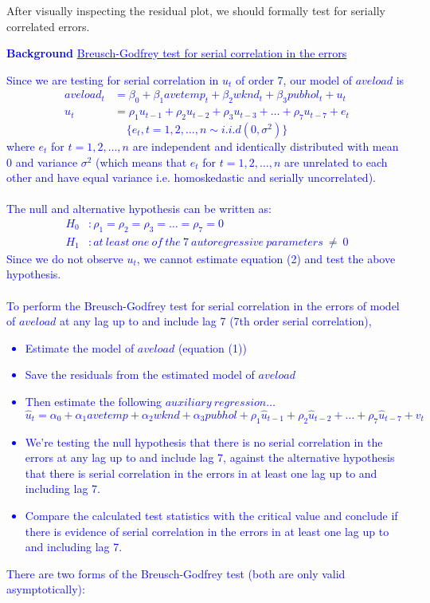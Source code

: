 \documentclass[12pt]{report}
\newenvironment{blueframed}[1][blue]
{\def\FrameCommand{\fboxsep=\FrameSep\fcolorbox{#1}{white}}%
\MakeFramed {\advance\hsize-\width \FrameRestore}}
{\endMakeFramed}
\begin{document}
\noindent After visually inspecting the residual plot, we should formally test for serially correlated errors.


\newpage
\justify
\begin{blueframed}
	\textcolor{blue}{\textbf{Background}}
	\vspace{-\baselineskip}
	\justify
	\textcolor{blue}{\underline{Breusch-Godfrey test for serial correlation in the errors}}
	
	\noindent \textcolor{blue}
	{
		Since we are testing for serial correlation in $u_t$ of order 7, our model of $aveload$ is
		\begin{align}
		aveload_t &= \beta_0 + \beta_1 avetemp_t + \beta_2wknd_t + \beta_3pubhol_t + u_t \\
		u_t &= \rho_1u_{t-1} + \rho_2u_{t-2} + \rho_3u_{t-3} + \dots + \rho_7u_{t-7} + e_t
		\end{align} $$\{e_t, t=1,2,\dots,n \sim i.i.d(0,\sigma^2)\}$$ where $e_t$ for $t=1,2,\dots,n$ are independent and identically distributed with mean 0 and variance $\sigma^2$ (which means that $e_t$ for $t=1,2,\dots,n$ are unrelated to each other and have equal variance i.e. homoskedastic and serially uncorrelated). \\ \\
		\noindent The null and alternative hypothesis can be written as:
		\begin{align*}
		H_0&: \rho_1 = \rho_2 = \rho_3 = \dots = \rho_7 = 0 \\
		H_1&: at\ least\ one\ of\ the\ 7\ autoregressive\ parameters\ \neq\ 0
		\end{align*} Since we do not observe $u_t$, we cannot estimate equation (2) and test the above hypothesis. \\ \\
		To perform the Breusch-Godfrey test for serial correlation in the errors of model of $aveload$ at any lag up to and include lag 7 (7th order serial correlation),
		\begin{itemize}
			\item Estimate the model of $aveload$ (equation (1))
			\item Save the residuals from the estimated model of $aveload$
			\item Then estimate the following $auxiliary\ regression \dots$ $$\hat{u}_t = \alpha_0 + \alpha_1avetemp + \alpha_2wknd + \alpha_3pubhol + \rho_1\hat{u}_{t-1} + \rho_2\hat{u}_{t-2} + \dots + \rho_7\hat{u}_{t-7} + v_t$$
			\item We're testing the null hypothesis that there is no serial correlation in the errors at any lag up to and include lag 7, against the alternative hypothesis that there is serial correlation in the errors in at least one lag up to and including lag 7.
			\item Compare the calculated test statistics with the critical value and conclude if there is evidence of serial correlation in the errors in at least one lag up to and including lag 7.
		\end{itemize}
		\noindent There are two forms of the Breusch-Godfrey test (both are only valid asymptotically):
	}
\end{blueframed}
\end{document}
